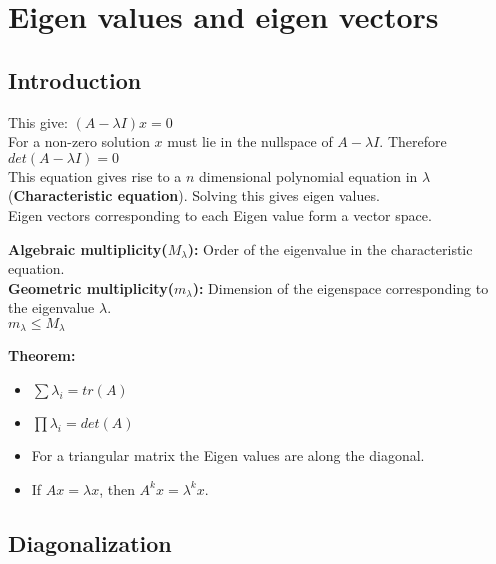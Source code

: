 \section{Eigen values and eigen vectors}

\subsection{Introduction}
\begin{center}
\end{center}

This give: $(A -\lambda I)x = 0$\\
For a non-zero solution $x$ must lie in the nullspace of $A - \lambda I$. Therefore $det(A-\lambda I) = 0$\\
This equation gives rise to a $n$ dimensional polynomial equation in $\lambda$(\textbf{Characteristic equation}). Solving this gives eigen values.\\
Eigen vectors corresponding to each Eigen value form a vector space.

\textbf{Algebraic multiplicity($M_{\lambda}$):} Order of the eigenvalue in the characteristic  equation.\\
\textbf{Geometric multiplicity($m_{\lambda}$):} Dimension of the eigenspace corresponding to the eigenvalue $\lambda$.\\ 
$m_{\lambda} \leq M_{\lambda}$

\begin{mdframed}[backgroundcolor=gray!20]
\textbf{Theorem:}
\begin{itemize}
\item $\sum \lambda_i = tr(A)$	
\item $\prod \lambda_i = det(A)$
\item For a triangular matrix the Eigen values are along the diagonal.
\item If $Ax = \lambda x$, then $A^kx = \lambda ^k x$.
\end{itemize}
\end{mdframed}

\subsection{Diagonalization}

